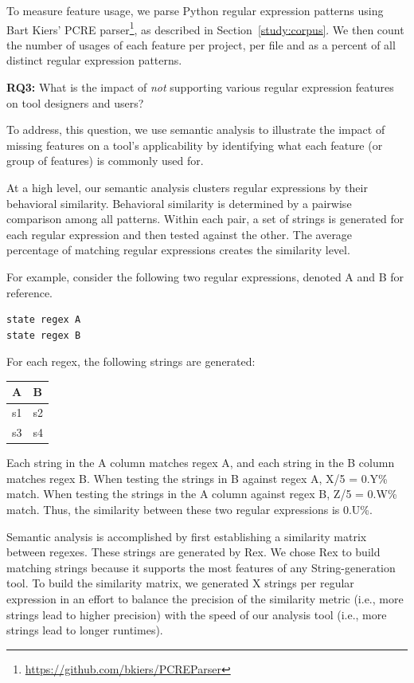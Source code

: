 To measure feature usage, we parse Python regular expression patterns using Bart Kiers' PCRE parser\footnote{\url{https://github.com/bkiers/PCREParser}}, as described in Section~\ref{study:corpus}.  We then count the number of usages of each feature per project, per file and as a percent of all distinct regular expression patterns.

\textbf{RQ3:} What is the impact of \emph{not} supporting various regular expression features on tool designers and users?

To address, this question, we use semantic analysis to illustrate the impact of missing features on a tool's applicability by identifying what each feature (or group of features) is commonly used for.

At a high level, our semantic analysis clusters regular expressions by their behavioral similarity. Behavioral similarity is determined by a pairwise comparison among all patterns. Within each pair, a set of strings is generated for each regular expression and then tested against the other. The average percentage of matching regular expressions creates the similarity level.

For example, consider the following two regular expressions, denoted A and B for reference.

\begin{verbatim}
state regex A
state regex B
\end{verbatim}

For each regex, the following strings are generated:

\begin{tabular}{l | l}
A & B \\ \hline
s1 & s2 \\
s3 & s4 \\
\end{tabular}

Each string in the A column matches regex A, and each string in the B column matches regex B. When testing the strings in B against regex A, X/5 = 0.Y\% match. When testing the strings in the A column against regex B, Z/5 = 0.W\% match. Thus, the similarity between these two regular expressions is 0.U\%.

Semantic analysis is accomplished by first establishing a similarity matrix between regexes. These strings are generated by Rex.  We chose Rex to build matching strings because it supports the most features of any String-generation tool. To build the similarity matrix, we generated X strings per regular expression in an effort to balance the precision of the similarity metric (i.e., more strings lead to higher precision) with the speed of our analysis tool (i.e., more strings lead to longer runtimes). 

